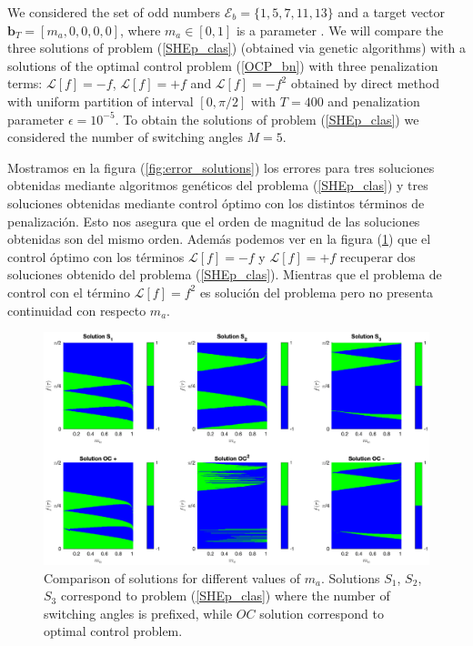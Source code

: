 We considered the set of odd numbers $\mathcal{E}_b = \{1,5,7,11,13\}$ and a target vector $\bm{b}_T = [m_a,0,0,0,0]$, where $m_a \in [0,1]$ is a parameter . We will compare the three solutions of problem (\ref{SHEp_clas}) (obtained via genetic algorithms) with a solutions of the optimal control problem (\ref{OCP_bn}) with three penalization terms: $\mathcal{L}[f] = -f$, $\mathcal{L}[f] = +f$ and $\mathcal{L}[f] = -f^2$ obtained by direct method with uniform partition of interval $[0,\pi/2]$ with $T=400$ and penalization parameter $\epsilon = 10^{-5}$. To obtain the solutions of problem (\ref{SHEp_clas}) we considered the number of switching angles $M=5$. 

Mostramos en la figura (\ref{fig:error_solutions}) los errores para tres soluciones obtenidas mediante algoritmos genéticos del problema (\ref{SHEp_clas}) y tres soluciones obtenidas mediante control óptimo con los distintos términos de penalización.  Esto nos asegura que el orden de magnitud de las soluciones obtenidas son del mismo orden. Además podemos ver en la figura (\ref{fig:solutions}) que el control óptimo con los términos $\mathcal{L}[f] = -f$ y $\mathcal{L}[f] = +f$ recuperar dos soluciones obtenido del problema (\ref{SHEp_clas}). Mientras que el problema de control con el término $\mathcal{L}[f] = f^2$ es solución del problema pero no presenta continuidad con respecto $m_a$.
 
\begin{figure}[!ht] 
        \centering
        \includegraphics[scale=0.5]{img/EX01_surf.eps}
        \caption{Comparison of solutions for different values of $m_a$. Solutions $S_1$, $S_2$, $S_3$ correspond to problem (\ref{SHEp_clas}) where the number of switching angles is prefixed, while $OC$ solution correspond to optimal control problem.}
        \label{fig:solutions}
    \end{figure}


